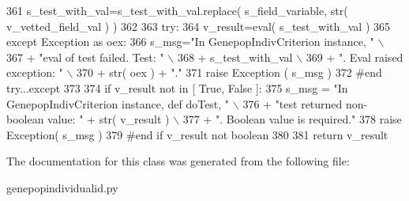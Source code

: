 \begin{DoxyCode}
361             s\_test\_with\_val=s\_test\_with\_val.replace( s\_field\_variable, str( v\_vetted\_field\_val ) )
362 
363         \textcolor{keywordflow}{try}:
364             v\_result=eval( s\_test\_with\_val )    
365         \textcolor{keywordflow}{except} Exception \textcolor{keyword}{as} oex:
366             s\_msg=\textcolor{stringliteral}{"In GenepopIndivCriterion instance, "} \(\backslash\)
367                     + \textcolor{stringliteral}{"eval of test failed.  Test: "} \(\backslash\)
368                     + s\_test\_with\_val \(\backslash\)
369                     + \textcolor{stringliteral}{".  Eval raised exception: "} \(\backslash\)
370                     + str( oex ) + \textcolor{stringliteral}{"."}
371             \textcolor{keywordflow}{raise} Exception ( s\_msg )
372         \textcolor{comment}{#end try...except}
373 
374         \textcolor{keywordflow}{if} v\_result \textcolor{keywordflow}{not} \textcolor{keywordflow}{in} [ \textcolor{keyword}{True}, \textcolor{keyword}{False} ]:
375             s\_msg = \textcolor{stringliteral}{"In GenepopIndivCriterion instance, def doTest, "} \(\backslash\)
376                             + \textcolor{stringliteral}{"test returned non-boolean value: "} + str( v\_result ) \(\backslash\)
377                             + \textcolor{stringliteral}{".  Boolean value is required."}
378             \textcolor{keywordflow}{raise} Exception( s\_msg )
379         \textcolor{comment}{#end if v\_result not boolean}
380 
381         \textcolor{keywordflow}{return} v\_result
\end{DoxyCode}


The documentation for this class was generated from the following file\+:\begin{DoxyCompactItemize}
\item 
genepopindividualid.\+py\end{DoxyCompactItemize}
